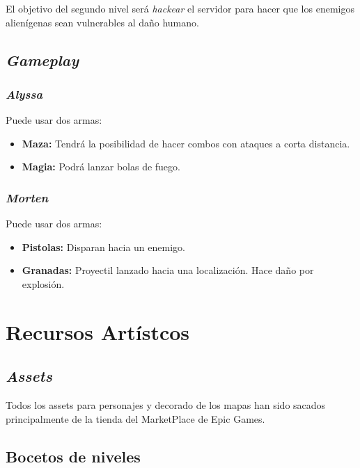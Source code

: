\documentclass[11pt, twoside]{article}
\begin{document}
El objetivo del segundo nivel será \textit{hackear} el servidor para hacer que los enemigos alienígenas sean vulnerables al daño humano. 

\subsection{\textit{Gameplay}}

\subsubsection{\textit{Alyssa}}
Puede usar dos armas:
\begin{itemize}
	\item \textbf{Maza:} Tendrá la posibilidad de hacer combos con ataques a corta distancia.
	\item \textbf{Magia:} Podrá lanzar bolas de fuego.
\end{itemize}

\subsubsection{\textit{Morten}}
Puede usar dos armas:
\begin{itemize}
	\item \textbf{Pistolas:} Disparan hacia un enemigo.
	\item \textbf{Granadas:} Proyectil lanzado hacia una localización. Hace daño por explosión. 
\end{itemize}

\newpage
\pagestyle{insection}
\section{Recursos Artístcos}

\subsection{\textit{Assets}}
Todos los assets para personajes y decorado de los mapas han sido sacados principalmente de la tienda del MarketPlace de Epic Games.

\subsection{Bocetos de niveles}
\end{document}
